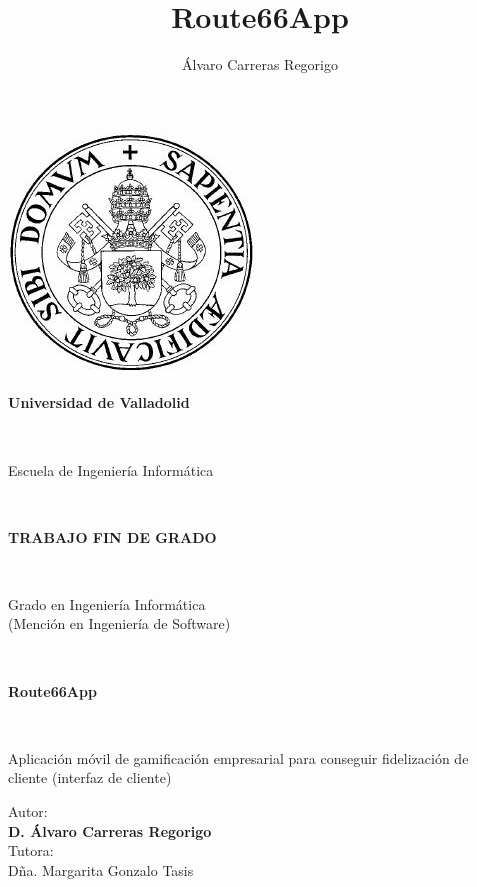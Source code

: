 \documentclass[twoside]{report}
\author{Álvaro Carreras Regorigo}
\title{Route66App}
\begin{document}
\begin{titlepage}
\begin{center}
\includegraphics[scale=0.5]{images/logoUVa}\\\vspace{1cm}
\begin{LARGE}\textbf{Universidad de Valladolid}\end{LARGE}\\
\vspace{2cm}
\begin{Huge}Escuela de Ingeniería Informática\end{Huge} \\\vspace{0.5cm}
\begin{large}\textsc{\textbf{TRABAJO FIN DE GRADO}}\end{large}\\ \vspace{2.5cm}
\begin{Large}Grado en Ingeniería Informática \\ (Mención en Ingeniería de Software)\end{Large}\\ \vspace{4cm}
\begin{Huge}\textbf{Route66App}\end{Huge}\\\vspace{0.5cm}
\begin{large}
Aplicación móvil de gamificación empresarial para conseguir fidelización de cliente (interfaz de cliente)
\end{large}
\end{center}\vspace{2cm}
\begin{flushright}
\begin{large}Autor: \\\textbf{D. Álvaro Carreras Regorigo}\\
Tutora:\\
Dña. Margarita Gonzalo Tasis\end{large}
\end{flushright}
\end{titlepage}
\clearpage
\end{document}
